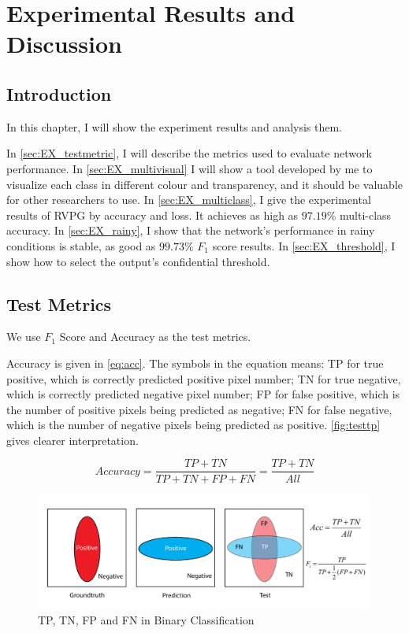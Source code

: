 
\chapter{Experimental Results and Discussion}
\label{cha:experiments}
\begin{spacing}{1.5}
\setlength{\parskip}{0.3in}

\section{Introduction}

In this chapter, I will show the experiment results and analysis them.

In \autoref{sec:EX_testmetric}, I will describe the metrics used to evaluate network performance. In \autoref{sec:EX_multivisual} I will show a tool developed by me to visualize each class in different colour and transparency, and it should be valuable for other researchers to use. In \autoref{sec:EX_multiclass}, I give the experimental results of RVPG by accuracy and loss. It achieves as high as $97.19\%$ multi-class accuracy. In \autoref{sec:EX_rainy}, I show that the network's performance in rainy conditions is stable, as good as $99.73\%$ $F_1$ score results. In \autoref{sec:EX_threshold}, I show how to select the output's confidential threshold.

\section{Test Metrics}
\label{sec:EX_testmetric}

We use $F_1$ Score and Accuracy as the test metrics.

Accuracy is given in \autoref{eq:acc}. The symbols in the equation means: TP for true positive, which is correctly predicted positive pixel number; TN for true negative, which is correctly predicted negative pixel number; FP for false positive, which is the number of positive pixels being predicted as negative; FN for false negative, which is the number of negative pixels being predicted as positive. \autoref{fig:testtp} gives clearer interpretation.

\begin{equation}
\label{eq:acc}
    Accuracy=\frac{TP+TN}{TP+TN+FP+FN}=\frac{TP+TN}{All}
\end{equation}

\begin{figure}[ht]
\centering
\includegraphics[width=0.99\textwidth, fbox]{Chapter5/testtp.pdf}
\caption{TP, TN, FP and FN in Binary Classification}
\label{fig:testtp} 
\end{figure}


\end{spacing}
